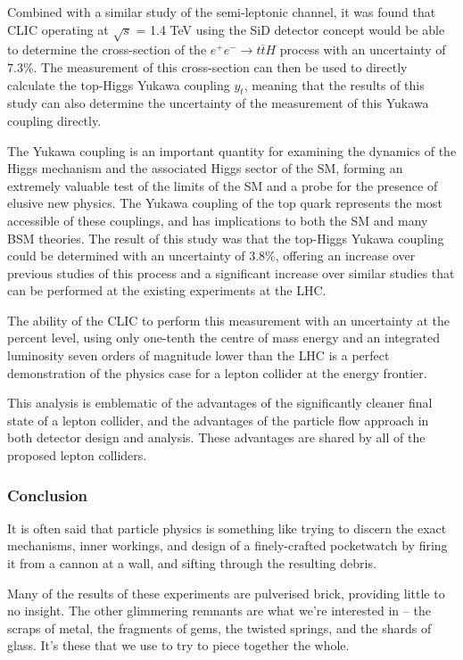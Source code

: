Combined with a similar study of the semi-leptonic channel, it was found that \acrshort{CLIC} operating at $\sqrt{s}$ = 1.4 TeV using the \acrshort{SiD} detector concept would be able to determine the cross-section of the $e^+ e^- \rightarrow t \overline{t} H$ process with an uncertainty of 7.3\%. The measurement of this cross-section can then be used to directly calculate the top-Higgs Yukawa coupling $y_t$, meaning that the results of this study can also determine the uncertainty of the measurement of this Yukawa coupling directly.

The Yukawa coupling is an important quantity for examining the dynamics of the Higgs mechanism and the associated Higgs sector of the \acrlong{SM}, forming an extremely valuable test of the limits of the \acrshort{SM} and a probe for the presence of elusive new physics. The Yukawa coupling of the top quark represents the most accessible of these couplings, and has implications to both the \acrshort{SM} and many \acrshort{BSM} theories. The result of this study was that the top-Higgs Yukawa coupling could be determined with an uncertainty of 3.8\%, offering an increase over previous studies of this process and a significant increase over similar studies that can be performed at the existing experiments at the \acrlong{LHC}.

The ability of the \acrlong{CLIC} to perform this measurement with an uncertainty at the percent level, using only one-tenth the centre of mass energy and an integrated luminosity seven orders of magnitude lower than the \acrshort{LHC} is a perfect demonstration of the physics case for a lepton collider at the energy frontier.

This analysis is emblematic of the advantages of the significantly cleaner final state of a lepton collider, and the advantages of the particle flow approach in both detector design and analysis. These advantages are shared by all of the proposed lepton colliders.

\subsubsection*{Conclusion}
It is often said that particle physics is something like trying to discern the exact mechanisms, inner workings, and design of a finely-crafted pocketwatch by firing it from a cannon at a wall, and sifting through the resulting debris.

Many of the results of these experiments are pulverised brick, providing little to no insight. The other glimmering remnants are what we're interested in -- the scraps of metal, the fragments of gems, the twisted springs, and the shards of glass. It's these that we use to try to piece together the whole.

